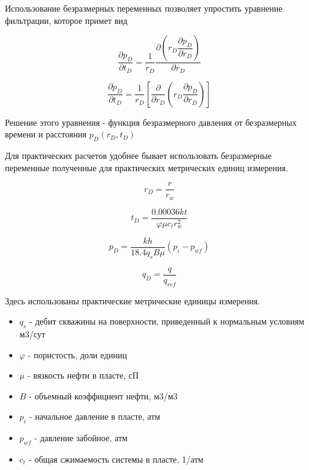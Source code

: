 \documentclass[
  russian,
  letterpaper,
  DIV=11,
  numbers=noendperiod,
  oneside]{scrartcl}
\providecommand{\tightlist}{%
  \setlength{\itemsep}{0pt}\setlength{\parskip}{0pt}}
\begin{document}
Использование безразмерных переменных позволяет упростить уравнение
фильтрации, которое примет вид

\[ 
\frac{\partial p_D}{ \partial t_D} = \frac{1}{r_D} \frac{ \partial{ \left( r_D \dfrac{\partial p_D}{ \partial r_D} \right) } }{ \partial{r_D} } 
\]

\[ 
\frac{\partial p_D}{ \partial t_D} = \dfrac{1}{r_D} \left[ \dfrac{\partial}{\partial r_D} \left( r_D \dfrac{ \partial p_D} {\partial r_D} \right) \right] 
\]

Решение этого уравнения - функция безразмерного давления от безразмерных
времени и расстояния \(p_D(r_D, t_D)\)

Для практических расчетов удобнее бывает использовать безразмерные
переменные полученные для практических метрических единиц измерения.

\begin{tcolorbox}[enhanced jigsaw, opacityback=0, title=\textcolor{quarto-callout-tip-color}{\faLightbulb}\hspace{0.5em}{Определение безразмерных переменных в практических метрических единицах}, breakable, rightrule=.15mm, toptitle=1mm, left=2mm, bottomtitle=1mm, opacitybacktitle=0.6, colframe=quarto-callout-tip-color-frame, coltitle=black, titlerule=0mm, leftrule=.75mm, bottomrule=.15mm, arc=.35mm, colback=white, colbacktitle=quarto-callout-tip-color!10!white, toprule=.15mm]

\[ 
r_D = \frac{r}{r_w} 
\]

\[ 
t_D = \frac{0.00036 kt}{\varphi \mu c_t r_w^2}
\]

\[ 
p_D = \frac{kh}{ 18.4 q_s B \mu} \left( p_i - p_{wf} \right) 
\]

\[ 
q_D = \frac{q}{q_{ref}} 
\]

Здесь использованы практические метрические единицы измерения.

\begin{itemize}
\tightlist
\item
  \(q_s\) - дебит скважины на поверхности, приведенный к нормальным
  условиям м3/сут
\item
  \(\varphi\) - пористость, доли единиц
\item
  \(\mu\) - вязкость нефти в пласте, сП
\item
  \(B\) - объемный коэффициент нефти, м3/м3
\item
  \(p_i\) - начальное давление в пласте, атм
\item
  \(p_{wf}\) - давление забойное, атм
\item
  \(c_t\) - общая сжимаемость системы в пласте, 1/атм
\end{itemize}

\end{tcolorbox}
\end{document}
